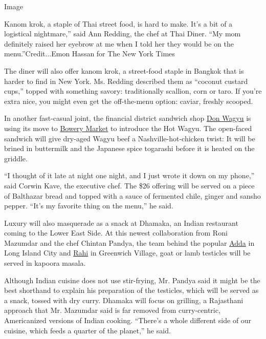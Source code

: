 Image

Kanom krok, a staple of Thai street food, is hard to make. It's a bit of
a logistical nightmare,'' said Ann Redding, the chef at Thai Diner. ``My
mom definitely raised her eyebrow at me when I told her they would be on
the menu.''Credit...Emon Hassan for The New York Times

The diner will also offer kanom krok, a street-food staple in Bangkok
that is harder to find in New York. Ms. Redding described them as
``coconut custard cups,'' topped with something savory: traditionally
scallion, corn or taro. If you're extra nice, you might even get the
off-the-menu option: caviar, freshly scooped.

In another fast-casual joint, the financial district sandwich shop
\href{https://www.nytimes3xbfgragh.onion/2018/06/25/dining/don-wagyu-sandwich-japan-sando.html}{Don
Wagyu} is using its move to
\href{http://www.thebowerymarket.com/}{Bowery Market} to introduce the
Hot Wagyu. The open-faced sandwich will give dry-aged Wagyu beef a
Nashville-hot-chicken twist: It will be brined in buttermilk and the
Japanese spice togarashi before it is heated on the griddle.

``I thought of it late at night one night, and I just wrote it down on
my phone,'' said Corwin Kave, the executive chef. The \$26 offering will
be served on a piece of Balthazar bread and topped with a sauce of
fermented chile, ginger and sansho pepper. ``It's my favorite thing on
the menu,'' he said.

Luxury will also masquerade as a snack at Dhamaka, an Indian restaurant
coming to the Lower East Side. At this newest collaboration from Roni
Mazumdar and the chef Chintan Pandya, the team behind the popular
\href{https://www.nytimes3xbfgragh.onion/2018/11/20/dining/adda-indian-canteen-review.html}{Adda}
in Long Island City and
\href{https://www.nytimes3xbfgragh.onion/2018/03/13/dining/indian-restaurants-manhattan-babu-ji.html}{Rahi}
in Greenwich Village, goat or lamb testicles will be served in kapoora
masala.

Although Indian cuisine does not use stir-frying, Mr. Pandya said it
might be the best shorthand to explain his preparation of the testicles,
which will be served as a snack, tossed with dry curry. Dhamaka will
focus on grilling, a Rajasthani approach that Mr. Mazumdar said is far
removed from curry-centric, Americanized versions of Indian cooking.
``There's a whole different side of our cuisine, which feeds a quarter
of the planet,'' he said.

